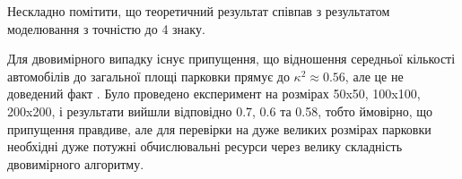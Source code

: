 Нескладно помітити, що теоретичний результат співпав з результатом моделювання з точністю до 4 знаку.

Для двовимірного випадку існує припущення, що відношення середньої кількості автомобілів до загальної площі парковки прямує до $\kappa^2 \approx 0.56$, але це не доведений факт \cite{MathWorldRenyi}. Було проведено експеримент на розмірах 50x50, 100x100, 200x200, і результати вийшли відповідно 0.7, 0.6 та 0.58, тобто ймовірно, що припущення правдиве, але для перевірки на дуже великих розмірах парковки необхідні дуже потужні обчислювальні ресурси через велику складність двовимірного алгоритму.
